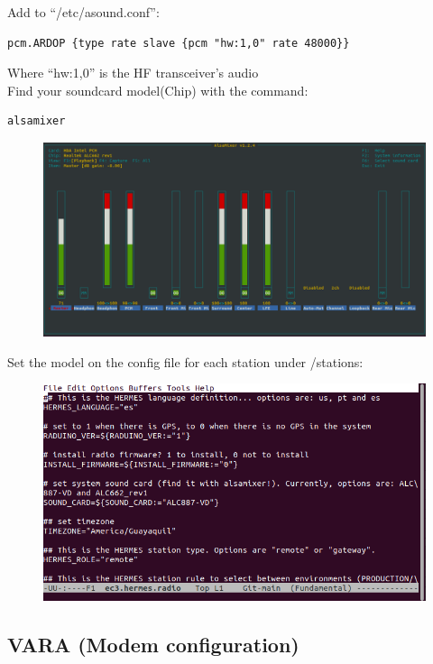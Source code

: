 \documentclass[11pt,a4paper]{article}
\begin{document}
Add to ``/etc/asound.conf'':
\begin{verbatim}
pcm.ARDOP {type rate slave {pcm "hw:1,0" rate 48000}}
\end{verbatim}

Where ``hw:1,0'' is the HF transceiver's audio \\

Find your soundcard model(Chip) with the command:
\begin{verbatim}
alsamixer
\end{verbatim}

\begin{figure}[h!]
  \centering
  \includegraphics[scale=0.36]{screenshots/software_stack/alsamixer.png}
  \label{fig3}
\end{figure}
  
Set the model on the config file for each station under /stations:

\begin{figure}[h!]
  \centering
  \includegraphics[scale=0.67]{screenshots/software_stack/set_system_soundcard.png}
  \label{fig4}
\end{figure}

\subsection{VARA (Modem configuration)}
\end{document}
